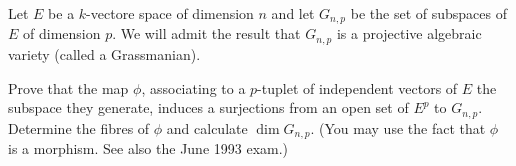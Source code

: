 \documentclass{article}
\begin{document}
 Let $E$ be a $k$-vectore space of dimension $n$ and let $G_{n,p}$ be the set of subspaces of $E$ of
dimension $p$. We will admit the result that $G_{n,p}$ is a projective algebraic variety (called a Grassmanian).

Prove that the map $\phi$, associating to a $p$-tuplet of independent vectors of $E$ the subspace they generate, 
induces a surjections from an open set of $E^p$ to $G_{n,p}$. Determine the fibres of $\phi$ and calculate
$\dim G_{n,p}$. (You may use the fact that $\phi$ is a morphism. See also the June 1993 exam.)
\end{document}

